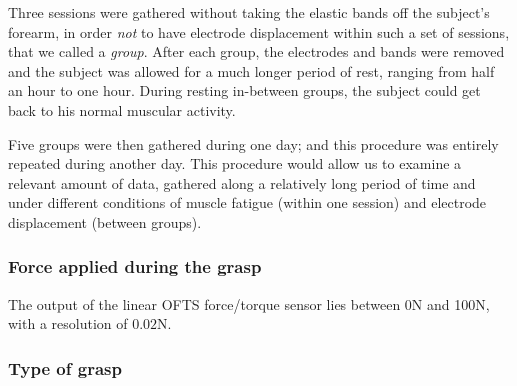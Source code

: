 Three sessions were gathered without taking the elastic bands off the
subject's forearm, in order \emph{not} to have electrode displacement
within such a set of sessions, that we called a \emph{group}. After
each group, the electrodes and bands were removed and the subject was
allowed for a much longer period of rest, ranging from half an hour to
one hour. During resting in-between groups, the subject could get back
to his normal muscular activity.

Five groups were then gathered during one day; and this procedure was
entirely repeated during another day. This procedure would allow us to
examine a relevant amount of data, gathered along a relatively long
period of time and under different conditions of muscle fatigue
(within one session) and electrode displacement (between groups).

%

\subsubsection{Force applied during the grasp}

The output of the linear OFTS force/torque sensor lies between 0N
and 100N, with a resolution of $0.02$N.

\subsubsection{Type of grasp}

